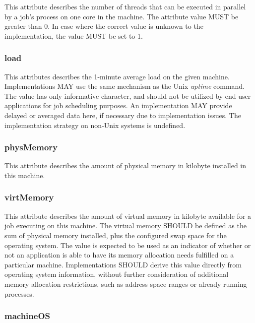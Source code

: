 \documentclass{article}
\newcommand{\rat}[1]{}
\begin{document}
This attribute describes the number of threads that can be executed in parallel by a job's process on one core in the machine. The attribute value MUST be greater than 0. In case where the correct value is unknown to the implementation, the value MUST be set to 1.

\subsubsection{load}

This attributes describes the 1-minute average load on the given machine. Implementations MAY use the same mechanism as the Unix \emph{uptime} command. The value has only informative character, and should not be utilized by end user applications for job scheduling purposes. An implementation MAY provide delayed or averaged data here, if necessary due to implementation issues. The implementation strategy on non-Unix systems is undefined.

\rat{In July 2011, there was a short debate on the list if this value should be normalized by the library to <0,1>. It was rejected, since DRMAA should just forward given information from the DRM / OS, for which the maximum value is typically not known. }

\subsubsection{physMemory}

This attribute describes the amount of physical memory in kilobyte installed in this machine.

\subsubsection{virtMemory}

This attribute describes the amount of virtual memory in kilobyte available for a job executing on this machine. The virtual memory SHOULD be defined as the sum of physical memory installed, plus the configured swap space for the operating system. The value is expected to be used as an indicator of whether or not an application is able to have its memory allocation needs fulfilled on a particular machine. Implementations SHOULD derive this value directly from operating system information, without further consideration of additional memory allocation restrictions, such as address space ranges or already running processes. 

\subsubsection{machineOS}
\end{document}
